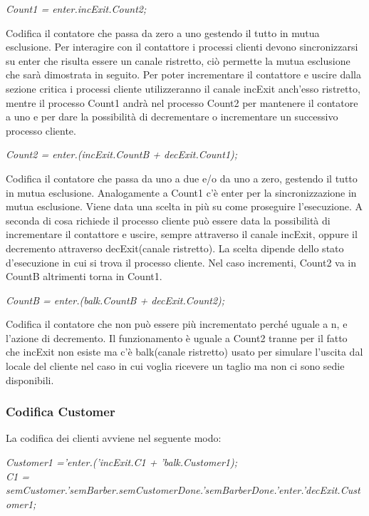 \emph{Count1 = enter.incExit.Count2;}

Codifica il contatore che passa da zero a uno gestendo il tutto in mutua esclusione. Per interagire con il contattore i processi clienti devono sincronizzarsi su enter che risulta essere un canale ristretto, ciò permette la mutua esclusione che sarà dimostrata in seguito. Per poter incrementare il contattore e uscire dalla sezione critica i processi cliente utilizzeranno il canale incExit anch'esso ristretto, mentre il processo Count1 andrà nel processo Count2 per mantenere il contatore a uno e per dare la possibilità di decrementare o incrementare un successivo processo cliente.

\emph{Count2 = enter.(incExit.CountB + decExit.Count1);}

Codifica il contatore che passa da uno a due e/o da uno a zero, gestendo il tutto in mutua esclusione. Analogamente a Count1 c'è enter per la sincronizzazione in mutua esclusione. Viene data una scelta in più su come proseguire l'esecuzione. A seconda di cosa richiede il processo cliente può essere data la possibilità di incrementare il contattore e uscire, sempre attraverso il canale incExit, oppure il decremento attraverso decExit(canale ristretto). La scelta dipende dello stato d'esecuzione in cui si trova il processo cliente. Nel caso incrementi, Count2 va in CountB altrimenti torna in Count1.

\emph{CountB = enter.(balk.CountB + decExit.Count2);}

Codifica il contatore che non può essere più incrementato perché uguale a n, e l'azione di decremento. Il funzionamento è uguale a Count2 tranne per il fatto che incExit non esiste ma c'è balk(canale ristretto) usato per simulare l'uscita dal locale del cliente nel caso in cui voglia ricevere un taglio ma non ci sono sedie disponibili.

\subsubsection{Codifica Customer}

La codifica dei clienti avviene nel seguente modo:

\emph{Customer1 ='enter.('incExit.C1 + 'balk.Customer1);}\\
\emph{C1 = semCustomer.'semBarber.semCustomerDone.'semBarberDone.'enter.'decExit.Customer1;}

